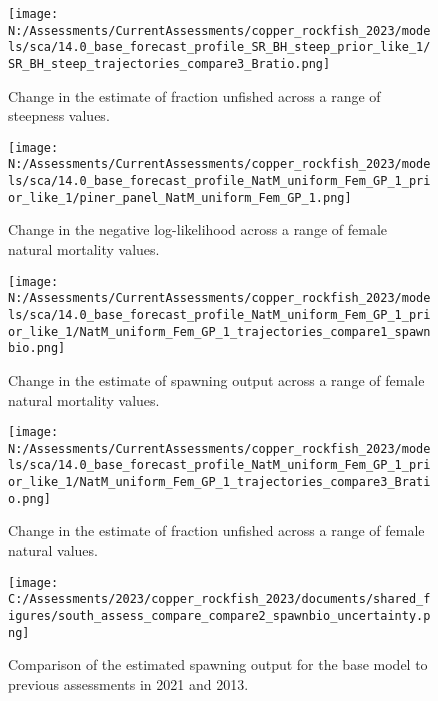 \documentclass[11pt,
  english,
  letterpaper,
]{article}
\begin{document}
\pagebreak

\begin{figure}
\centering
\texttt{[image: N:/Assessments/CurrentAssessments/copper\_rockfish\_2023/models/sca/14.0\_base\_forecast\_profile\_SR\_BH\_steep\_prior\_like\_1/SR\_BH\_steep\_trajectories\_compare3\_Bratio.png]}
\caption{Change in the estimate of fraction unfished across a range of steepness values.\label{fig:h-depl}}
\end{figure}

\pagebreak

\begin{figure}
\centering
\texttt{[image: N:/Assessments/CurrentAssessments/copper\_rockfish\_2023/models/sca/14.0\_base\_forecast\_profile\_NatM\_uniform\_Fem\_GP\_1\_prior\_like\_1/piner\_panel\_NatM\_uniform\_Fem\_GP\_1.png]}
\caption{Change in the negative log-likelihood across a range of female natural mortality values.\label{fig:m-profile}}
\end{figure}

\pagebreak

\begin{figure}
\centering
\texttt{[image: N:/Assessments/CurrentAssessments/copper\_rockfish\_2023/models/sca/14.0\_base\_forecast\_profile\_NatM\_uniform\_Fem\_GP\_1\_prior\_like\_1/NatM\_uniform\_Fem\_GP\_1\_trajectories\_compare1\_spawnbio.png]}
\caption{Change in the estimate of spawning output across a range of female natural mortality values.\label{fig:m-ssb}}
\end{figure}

\pagebreak

\begin{figure}
\centering
\texttt{[image: N:/Assessments/CurrentAssessments/copper\_rockfish\_2023/models/sca/14.0\_base\_forecast\_profile\_NatM\_uniform\_Fem\_GP\_1\_prior\_like\_1/NatM\_uniform\_Fem\_GP\_1\_trajectories\_compare3\_Bratio.png]}
\caption{Change in the estimate of fraction unfished across a range of female natural values.\label{fig:m-depl}}
\end{figure}

\begin{figure}
\centering
\texttt{[image: C:/Assessments/2023/copper\_rockfish\_2023/documents/shared\_figures/south\_assess\_compare\_compare2\_spawnbio\_uncertainty.png]}
\caption{Comparison of the estimated spawning output for the base model to previous assessments in 2021 and 2013.\label{fig:comp-assess-sb}}
\end{figure}
\end{document}
